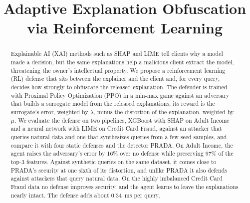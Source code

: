 \documentclass[conference]{IEEEtran}
\DeclareRobustCommand{\revnew}[1]{#1}
\begin{document}
\title{Adaptive Explanation Obfuscation via Reinforcement Learning}

\author{
\and
{}
\and
{}
\and
{}
}

\maketitle

\begin{abstract}
\revnew{Explainable AI (XAI) methods such as SHAP and LIME tell clients why a model made a decision, but the same explanations help a malicious client extract the model, threatening the owner's intellectual property. We propose a reinforcement learning (RL) defense that sits between the explainer and the client and, for every query, decides how strongly to obfuscate the released explanation. The defender is trained with Proximal Policy Optimization (PPO) in a min-max game against an adversary that builds a surrogate model from the released explanations; its reward is the surrogate's error, weighted by $\lambda$, minus the distortion of the explanation, weighted by $\mu$. We evaluate the defense on two pipelines, XGBoost with SHAP on Adult Income and a neural network with LIME on Credit Card Fraud, against an attacker that queries natural data and one that synthesizes queries from a few seed samples, and compare it with four static defenses and the detector PRADA. On Adult Income, the agent raises the adversary's error by 16\% over no defense while preserving 97\% of the top-3 features. Against synthetic queries on the same dataset, it comes close to PRADA's security at one sixth of its distortion, and unlike PRADA it also defends against attackers that query natural data. On the highly imbalanced Credit Card Fraud data no defense improves security, and the agent learns to leave the explanations nearly intact. The defense adds about 0.34~ms per query.}
\end{abstract}
\end{document}
